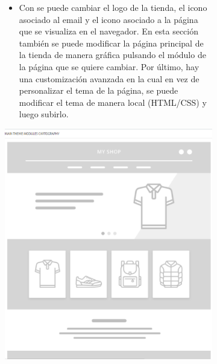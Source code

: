 \documentclass{article}
\begin{document}
\begin{figure}[h!]
        \raggedright     
        \begin{subfigure}[!]{0.7\textwidth} 
            \begin{itemize}
				\item[\triangleright] Con  se puede cambiar el logo de la tienda, el icono asociado al email y el icono asociado a la página que se visualiza                                                     en el navegador. En esta sección también se puede modificar la página principal de la tienda de manera gráfica pulsando el módulo de la página que se quiere cambiar. Por último, hay una customización avanzada en la cual en vez de personalizar el tema de la página, se puede modificar el tema de manera local (HTML/CSS) y luego subirlo.
			\end{itemize}
        \end{subfigure}
        \begin{subfigure}[!]{0.29\textwidth} 
            \includegraphics[width=\textwidth]{images/themelogo.png}
        \end{subfigure}  
    \end{figure}
    
\end{document}
